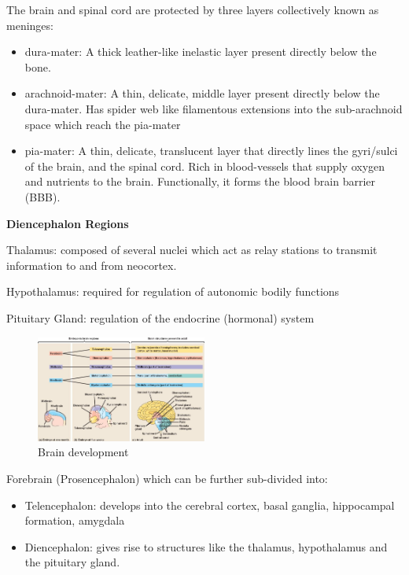 \documentclass{article}
\begin{document}
    \noindent The brain and spinal cord are protected by three layers collectively known as meninges:
    
    \begin{itemize}
        \item dura-mater: A thick leather-like inelastic layer present directly below the bone.
        \item arachnoid-mater: A thin, delicate, middle layer present directly below the dura-mater. Has spider web like filamentous extensions into the sub-arachnoid space which reach the pia-mater
        \item pia-mater: A thin, delicate, translucent layer that directly lines the gyri/sulci of the brain, and the spinal cord. Rich in blood-vessels that supply oxygen and nutrients to the brain. Functionally, it forms the blood brain barrier (BBB).
    \end{itemize}
    
    \noindent \textbf{Diencephalon Regions}
    
    Thalamus: composed of several nuclei which act as relay stations to transmit information to and from neocortex.
    
    Hypothalamus: required for regulation of autonomic bodily functions
    
    Pituitary Gland: regulation of the endocrine (hormonal) system
    
    \begin{figure}[H]
    \centering
    \includegraphics[width=0.5\textwidth]{assets/development.png}
    \caption{Brain development}
    \end{figure}
    
    \noindent Forebrain (Prosencephalon) which can be further sub-divided into:
    \begin{itemize}
        \item Telencephalon: develops into the cerebral cortex, basal ganglia, hippocampal formation, amygdala
        \item Diencephalon: gives rise to structures like the thalamus, hypothalamus and the pituitary gland.
    \end{itemize}
    
\end{document}
